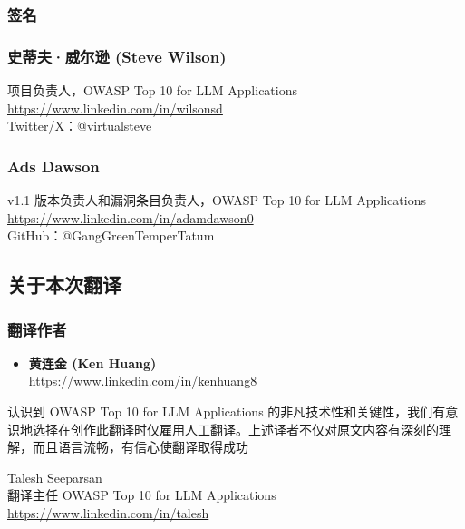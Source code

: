 \documentclass[
]{article}
\providecommand{\tightlist}{%
  \setlength{\itemsep}{0pt}\setlength{\parskip}{0pt}}
\begin{document}
\subsubsection{签名}\label{ux7b7eux540d}

\subsubsection{史蒂夫·威尔逊 (Steve
Wilson)}\label{ux53f2ux8482ux592bux5a01ux5c14ux900a-steve-wilson}

项目负责人，OWASP Top 10 for LLM Applications\\
\href{https://www.linkedin.com/in/wilsonsd/}{https://www.linkedin.com/in/wilsonsd}\\
Twitter/X：@virtualsteve

\subsubsection{Ads Dawson}\label{ads-dawson}

v1.1 版本负责人和漏洞条目负责人，OWASP Top 10 for LLM Applications\\
\href{https://www.linkedin.com/in/adamdawson0/}{https://www.linkedin.com/in/adamdawson0}\\
GitHub：@GangGreenTemperTatum

\subsection{关于本次翻译}\label{ux5173ux4e8eux672cux6b21ux7ffbux8bd1}

\subsubsection{翻译作者}\label{ux7ffbux8bd1ux4f5cux8005}

\begin{itemize}
\tightlist
\item
  \textbf{黄连金 (Ken Huang)}\\
  \href{https://www.linkedin.com/in/kenhuang8/}{https://www.linkedin.com/in/kenhuang8}
\end{itemize}

认识到 OWASP Top 10 for LLM Applications
的非凡技术性和关键性，我们有意识地选择在创作此翻译时仅雇用人工翻译。上述译者不仅对原文内容有深刻的理解，而且语言流畅，有信心使翻译取得成功

Talesh Seeparsan\\
翻译主任 OWASP Top 10 for LLM Applications
\href{https://www.linkedin.com/in/talesh/}{https://www.linkedin.com/in/talesh}
\end{document}
